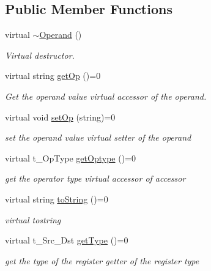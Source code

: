 \subsection*{Public Member Functions}
\begin{DoxyCompactItemize}
\item 
\hypertarget{classOperand_aa6ef1ffa183381edb413f9b93782a67b}{
virtual \hyperlink{classOperand_aa6ef1ffa183381edb413f9b93782a67b}{$\sim$Operand} ()}
\label{classOperand_aa6ef1ffa183381edb413f9b93782a67b}

\begin{DoxyCompactList}\small\item\em Virtual destructor. \item\end{DoxyCompactList}\item 
\hypertarget{classOperand_a8cf27955648cbf07144abf4e5a77c266}{
virtual string \hyperlink{classOperand_a8cf27955648cbf07144abf4e5a77c266}{getOp} ()=0}
\label{classOperand_a8cf27955648cbf07144abf4e5a77c266}

\begin{DoxyCompactList}\small\item\em Get the operand value virtual accessor of the operand. \item\end{DoxyCompactList}\item 
\hypertarget{classOperand_a9c31a741d9c16506a9e6c9217e205bd0}{
virtual void \hyperlink{classOperand_a9c31a741d9c16506a9e6c9217e205bd0}{setOp} (string)=0}
\label{classOperand_a9c31a741d9c16506a9e6c9217e205bd0}

\begin{DoxyCompactList}\small\item\em set the operand value virtual setter of the operand \item\end{DoxyCompactList}\item 
virtual t\_\-OpType \hyperlink{classOperand_af4bd7dab87bfd7f3c17ea84f07b02b69}{getOptype} ()=0
\begin{DoxyCompactList}\small\item\em get the operator type virtual accessor of accessor \item\end{DoxyCompactList}\item 
virtual string \hyperlink{classOperand_aaa9879d6c4fb8334c1b4d97dad614cef}{toString} ()=0
\begin{DoxyCompactList}\small\item\em virtual tostring \item\end{DoxyCompactList}\item 
\hypertarget{classOperand_af9f77597fd0bfb387989fae7acf71957}{
virtual t\_\-Src\_\-Dst \hyperlink{classOperand_af9f77597fd0bfb387989fae7acf71957}{getType} ()=0}
\label{classOperand_af9f77597fd0bfb387989fae7acf71957}

\begin{DoxyCompactList}\small\item\em get the type of the register getter of the register type \item\end{DoxyCompactList}\end{DoxyCompactItemize}

